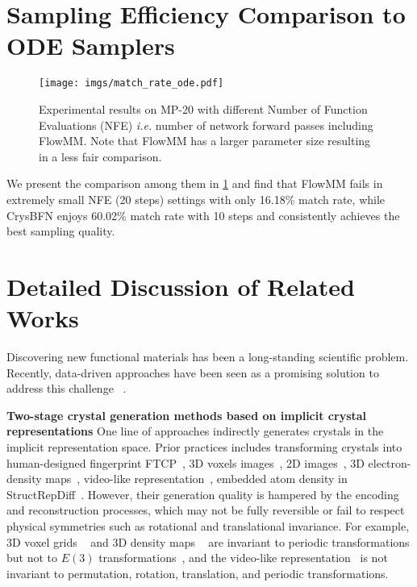 \section{Sampling Efficiency Comparison to ODE Samplers}
\begin{figure}[h!] %
    \centering
    \texttt{[image: imgs/match\_rate\_ode.pdf]} 
    \caption{Experimental results on MP-20 with different Number of Function Evaluations (NFE) \emph{i.e.} number of network forward passes including FlowMM. Note that FlowMM has a larger parameter size resulting in a less fair comparison.} %
    \label{fig:ode_compare}
\vskip -0.2in
\end{figure}
We present the comparison among them in \cref{fig:ode_compare} and find that FlowMM fails in extremely small NFE (20 steps) settings with only 16.18\% match rate, while CrysBFN enjoys 60.02\% match rate with 10 steps and consistently achieves the best sampling quality. 

\section{Detailed Discussion of Related Works}
\label{appd:detailed_related_works}
Discovering new functional materials has been a long-standing scientific problem. Recently, data-driven approaches have been seen as a promising solution to address this challenge ~\cite{peng2022human}.

\textbf{Two-stage crystal generation methods based on implicit crystal representations} One line of approaches indirectly generates crystals in the implicit representation space. Prior practices includes transforming crystals into human-designed fingerprint FTCP~\citep{REN2021}, 3D voxels images~\citep{hoffmann2019data}, 2D images~\citep{noh2019inverse}, 3D electron-density maps~\citep{court20203}, video-like representation~\citep{yang2023scalable}, embedded atom density \citep{zhang2019embedded} in StructRepDiff~\citep{sinha2024representation}. However, their generation quality is hampered by the encoding and reconstruction processes, which may not be fully reversible or fail to respect physical symmetries such as rotational and translational invariance. For example, 3D voxel grids ~\citep{hoffmann2019data} and 3D density maps ~\citep{court20203} are invariant to periodic transformations but not to \(E(3)\) transformations~\citep{zhang2023artificial}, and the video-like representation~\citep{yang2023scalable} is not invariant to permutation, rotation, translation, and periodic transformations. 

